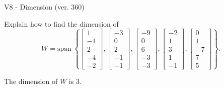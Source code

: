 \begin{exercise}
  \begin{exerciseTitle}V8 - Dimension (ver. 360)\end{exerciseTitle}
  \begin{exerciseStatement}
    Explain how to find the dimension of 
\[W=\mathrm{span}\ \left\{\left[\begin{array}{r}
1 \\
-1 \\
2 \\
-4 \\
-2
\end{array}\right] , \left[\begin{array}{r}
-3 \\
0 \\
2 \\
-1 \\
-1
\end{array}\right] , \left[\begin{array}{r}
-9 \\
0 \\
6 \\
-3 \\
-3
\end{array}\right] , \left[\begin{array}{r}
-2 \\
1 \\
3 \\
1 \\
-1
\end{array}\right] , \left[\begin{array}{r}
0 \\
1 \\
-7 \\
7 \\
5
\end{array}\right]\right\}.\]



  \end{exerciseStatement}
  \begin{exerciseAnswer}
   The dimension of \(W\) is  \(3\).
  


  \end{exerciseAnswer}
\end{exercise}